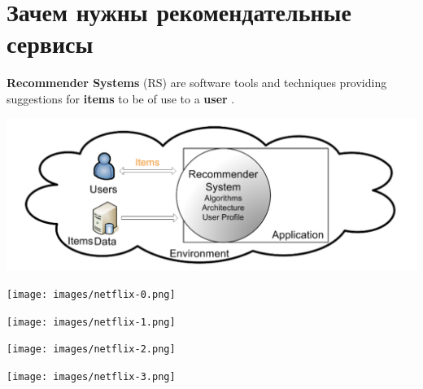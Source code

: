 \documentclass[11pt,aspectratio=169,handout]{beamer}
\begin{document}
\section{Зачем нужны рекомендательные сервисы}

\begin{frame}{}

\vfill
\begin{tcolorbox}[colback=info!5,colframe=info!80,title=]
{\bf Recommender Systems} (RS) are software tools and techniques providing suggestions for {\bf items} to be of use to a {\bf user} \cite{RSHB}.
\end{tcolorbox}
\vfill
\begin{center}
\includegraphics[scale=0.3]{images/overall.png}
\end{center}

\end{frame}

\begin{frame}{}

\begin{center}
\texttt{[image: images/netflix-0.png]}
\end{center}

\end{frame}

\begin{frame}{}

\begin{center}
\texttt{[image: images/netflix-1.png]}
\end{center}

\end{frame}

\begin{frame}{}

\begin{center}
\texttt{[image: images/netflix-2.png]}
\end{center}

\end{frame}

\begin{frame}{}

\begin{center}
\texttt{[image: images/netflix-3.png]}
\end{center}

\end{frame}
\end{document}
